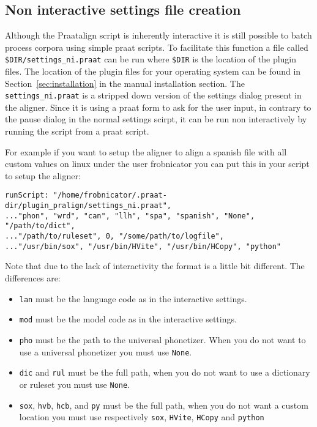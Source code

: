 \subsection{Non interactive settings file creation}
Although the Praatalign script is inherently interactive it is still possible
to batch process corpora using simple praat scripts. To facilitate this
function a file called \texttt{\$DIR/settings\_ni.praat} can be run where
\texttt{\$DIR} is the location of the plugin files. The location of the plugin
files for your operating system can be found in Section~\ref{sec:installation}
in the manual installation section. The \texttt{settings\_ni.praat} is a
stripped down version of the settings dialog present in the aligner. Since it
is using a praat form to ask for the user input, in contrary to the pause
dialog in the normal settings scirpt, it can be run non interactively by
running the script from a praat script.

For example if you want to setup the aligner to align a spanish file with all
custom values on linux under the user frobnicator you can put this in your
script to setup the aligner:

\begin{lstlisting}
runScript: "/home/frobnicator/.praat-dir/plugin_pralign/settings_ni.praat",
..."phon", "wrd", "can", "llh", "spa", "spanish", "None", "/path/to/dict",
..."/path/to/ruleset", 0, "/some/path/to/logfile",
..."/usr/bin/sox", "/usr/bin/HVite", "/usr/bin/HCopy", "python"
\end{lstlisting}

Note that due to the lack of interactivity the format is a little bit
different. The differences are:
\begin{itemize}
	\item \texttt{lan} must be the language code as in the interactive settings.
	\item \texttt{mod} must be the model code as in the interactive settings.
	\item \texttt{pho} must be the path to the universal phonetizer. When you do
not want to use a universal phonetizer you must use \texttt{None}.
	\item \texttt{dic} and \texttt{rul} must be the full path, when you do not
want to use a dictionary or ruleset you must use \texttt{None}.
	\item \texttt{sox}, \texttt{hvb}, \texttt{hcb}, and \texttt{py} must be the
full path, when you do not want a custom location you must use respectively
\texttt{sox}, \texttt{HVite}, \texttt{HCopy} and \texttt{python}
\end{itemize}

